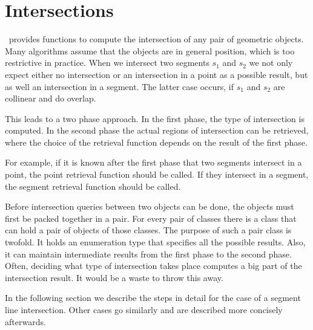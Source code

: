
\cleardoublepage
\chapter{Intersections}

\cgal\ provides functions to compute the intersection of any pair of
geometric objects. Many algorithms assume that the objects are in
general position, which is too restrictive in practice. When we
intersect two segments $s_1$ and $s_2$ we not only expect either no
intersection or an intersection in a point as a possible result, but
as well an intersection in a segment.  The latter case occurs, if
$s_1$ and $s_2$ are collinear and do overlap.

This leads to a two phase approach.  In the first phase, the type of
intersection is computed.  In the second phase the actual regions of
intersection can be retrieved, where the choice of the retrieval
function depends on the result of the first phase.

For example, if it is known after the first phase that two segments
intersect in a point, the point retrieval function should be called.
If they intersect in a segment, the segment retrieval function should
be called.

Before intersection queries between two objects can be done, the
objects must first be packed together in a pair.  For every pair of
classes there is a class that can hold a pair of objects of those
classes.  The purpose of such a pair class is twofold.  It holds an
enumeration type that specifies all the possible results.  Also, it
can maintain intermediate results from the first phase to the second
phase. Often, deciding what type of intersection takes place computes
a big part of the intersection result. It would be a waste to throw
this away.

In the following section we describe the steps in detail for the case
 of a segment line intersection. Other cases go similarly and are
 described more concisely afterwards.



